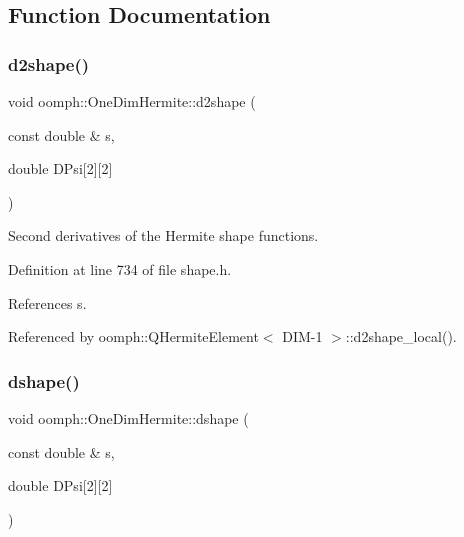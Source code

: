 \subsection{Function Documentation}
\mbox{\label{namespaceoomph_1_1OneDimHermite_a84928411c3c92bf563b9f04005436fd1}} 
\subsubsection{\texorpdfstring{d2shape()}{d2shape()}}
{\footnotesize\ttfamily void oomph\+::\+One\+Dim\+Hermite\+::d2shape (\begin{DoxyParamCaption}\item[{const double \&}]{s,  }\item[{double}]{D\+Psi\mbox{[}2\mbox{]}\mbox{[}2\mbox{]} }\end{DoxyParamCaption})\hspace{0.3cm}{\ttfamily [inline]}}



Second derivatives of the Hermite shape functions. 



Definition at line 734 of file shape.\+h.



References s.



Referenced by oomph\+::\+Q\+Hermite\+Element$<$ D\+I\+M-\/1 $>$\+::d2shape\+\_\+local().

\mbox{\label{namespaceoomph_1_1OneDimHermite_a813edd3bba87119e400fbcf996e48b2d}} 
\subsubsection{\texorpdfstring{dshape()}{dshape()}}
{\footnotesize\ttfamily void oomph\+::\+One\+Dim\+Hermite\+::dshape (\begin{DoxyParamCaption}\item[{const double \&}]{s,  }\item[{double}]{D\+Psi\mbox{[}2\mbox{]}\mbox{[}2\mbox{]} }\end{DoxyParamCaption})\hspace{0.3cm}{\ttfamily [inline]}}



